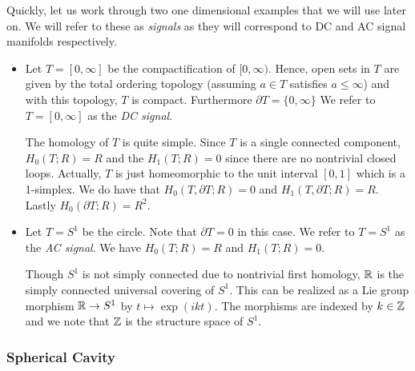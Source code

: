 \documentclass{article}
\begin{document}
Quickly, let us work through two one dimensional examples that we will use later on. We will refer to these as \emph{signals} as they will correspond to DC and AC signal manifolds respectively.
\begin{itemize}
    \item Let $T=[0,\infty]$ be the compactification of $[0,\infty)$. Hence, open sets in $T$ are given by the total ordering topology (assuming $a \in T$ satisfies $a\leq \infty$) and with this topology, $T$ is compact. Furthermore $\partial T = \{0,\infty\}$ We refer to $T=[0,\infty]$ as the \emph{DC signal}.
    
    The homology of $T$ is quite simple. Since $T$ is a single connected component, $H_0(T;R)=R$ and the $H_1(T;R)=0$ since there are no nontrivial closed loops. Actually, $T$ is just homeomorphic to the unit interval $[0,1]$ which is a 1-simplex. We do have that $H_0(T,\partial T;R)=0$ and $H_1(T,\partial T;R)=R$. Lastly $H_0(\partial T;R)=R^2$.
    
    \item Let $T=S^1$ be the circle. Note that $\partial T=0$ in this case. We refer to $T=S^1$ as the \emph{AC signal}. We have $H_0(T;R)=R$ and $H_1(T;R)=0$. 
    
    \begin{remark}
    Though $S^1$ is not simply connected due to nontrivial first homology, $\mathbb{R}$ is the simply connected universal covering of $S^1$. This can be realized as a Lie group morphism $\mathbb{R} \to S^1$ by $t \mapsto \exp(ikt)$. The morphisms are indexed by $k\in \mathbb{Z}$ and we note that $\mathbb{Z}$ is the structure space of $S^1$.
    \end{remark}
\end{itemize}

\subsubsection{Spherical Cavity}
\end{document}
